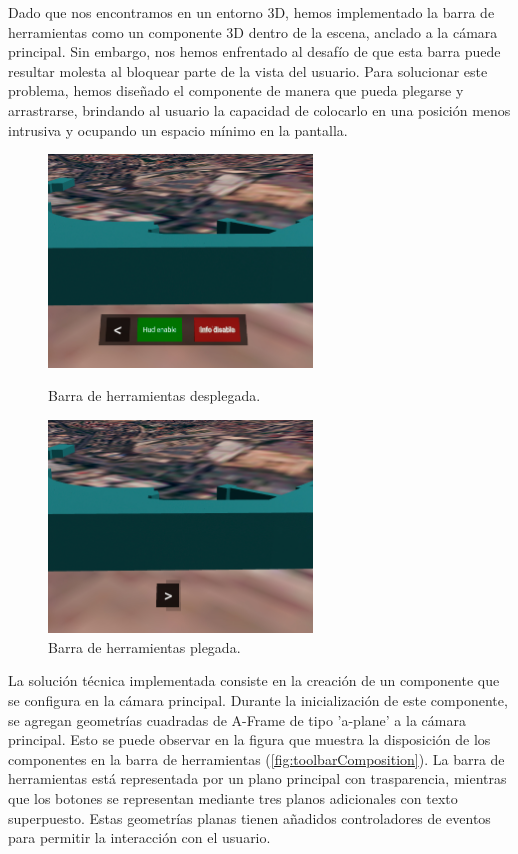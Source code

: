 \documentclass[a4paper, 11pt]{book}
\begin{document}
Dado que nos encontramos en un entorno 3D, hemos implementado la barra de herramientas como un componente 3D dentro de la escena, anclado a la cámara principal. Sin embargo, nos hemos enfrentado al desafío de que esta barra puede resultar molesta al bloquear parte de la vista del usuario. Para solucionar este problema, hemos diseñado el componente de manera que pueda plegarse y arrastrarse, brindando al usuario la capacidad de colocarlo en una posición menos intrusiva y ocupando un espacio mínimo en la pantalla.
\begin{figure}[H]
  \begin{minipage}[t]{0.5\linewidth}
    \centering
    \includegraphics[width=7cm, keepaspectratio]{img/toolbarAbierta.jpg}
    \caption{Barra de herramientas desplegada.}
    \label{fig:toolbarDesplegada}
  \end{minipage}%
  \begin{minipage}[t]{0.5\linewidth}
    \centering
    \includegraphics[width=7cm, keepaspectratio]{img/toolbarPlegada.jpg}
    \caption{Barra de herramientas plegada.}
    \label{fig:toolbarPlegada}    
  \end{minipage}
\end{figure}
La solución técnica implementada consiste en la creación de un componente que se configura en la cámara principal. Durante la inicialización de este componente, se agregan geometrías cuadradas de A-Frame de tipo 'a-plane' a la cámara principal. Esto se puede observar en la figura que muestra la disposición de los componentes en la barra de herramientas (\ref{fig:toolbarComposition}). La barra de herramientas está representada por un plano principal con trasparencia, mientras que los botones se representan mediante tres planos adicionales con texto superpuesto. Estas geometrías planas tienen añadidos controladores de eventos para permitir la interacción con el usuario.
\end{document}
